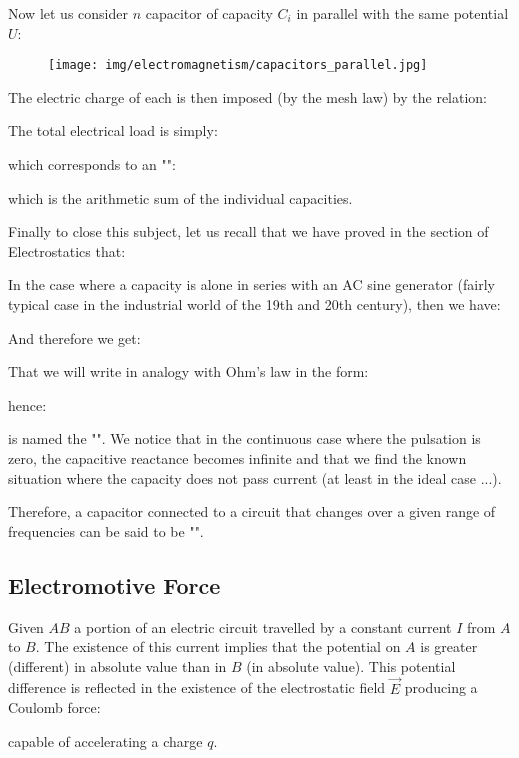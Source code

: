 	Now let us consider $n$ capacitor of  capacity $C_i$ in parallel with the same potential $U$:
	\begin{figure}[H]
		\centering
		\texttt{[image: img/electromagnetism/capacitors\_parallel.jpg]}
	\end{figure}	
	The electric charge of each is then imposed (by the mesh law) by the relation:
	
	The total electrical load is simply:
	
	which corresponds to an "":
	
	which is the arithmetic sum of the individual capacities.

	Finally to close this subject, let us recall that we have proved in the section of Electrostatics that:
	
	In the case where a capacity is alone in series with an AC sine generator (fairly typical case in the industrial world of the 19th and 20th century), then we have:
	
	And therefore we get:
	
	That we will write in analogy with Ohm's law in the form:
	
	hence:
		
	is named the "". We notice that in the continuous case where the pulsation is zero, the capacitive reactance becomes infinite and that we find the known situation where the capacity does not pass current (at least in the ideal case ...).
	
	Therefore, a capacitor connected to a circuit that changes over a given range of frequencies can be said to be "".
	
	\pagebreak
	\subsection{Electromotive Force}\label{electromotive force}
	Given $AB$ a portion of an electric circuit travelled by a constant current $I$ from $A$ to $B$. The existence of this current implies that the potential on $A$ is greater (different) in absolute value than in $B$ (in absolute value). This potential difference is reflected in the existence of the electrostatic field $\vec{E}$ producing a Coulomb force:
	
	capable of accelerating a charge $q$.

